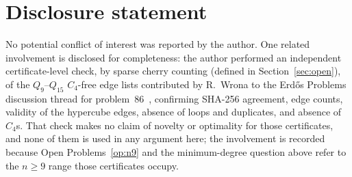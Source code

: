 \documentclass[12pt]{article}
\begin{document}
\section*{Disclosure statement}
No potential conflict of interest was reported by the author. One related
involvement is disclosed for completeness: the author performed an independent
certificate-level check, by sparse cherry counting (defined in
Section~\ref{sec:open}), of the $Q_9$--$Q_{15}$
$C_4$-free edge lists contributed by R.~Wrona to the Erd\H{o}s Problems
discussion thread for problem~86~\cite{EP86}, confirming SHA-256 agreement,
edge counts, validity of the hypercube edges, absence of loops and duplicates,
and absence of $C_4$s. That check makes no claim of novelty or optimality for
those certificates, and none of them is used in any argument here; the
involvement is recorded because Open Problems~\ref{op:n9} and the minimum-degree
question above refer to the $n\ge9$ range those certificates occupy.
\end{document}
